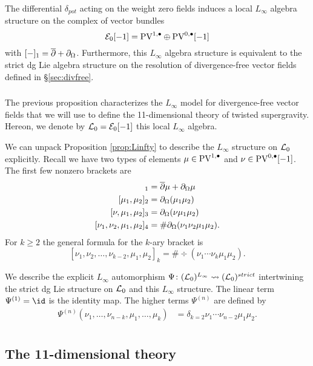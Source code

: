 \documentclass[11pt]{amsart}
\begin{document}
\begin{prop}
\label{prop:Linfty}
The differential $\delta_{pot}$ acting on the weight zero fields induces a local $L_\infty$ algebra structure on the complex of vector bundles 
\[
\mathcal E_0 [-1] = {\rm PV}^{1,\bullet} \oplus {\rm PV}^{0,\bullet}[-1]
\]
with $[-]_1 = \overline{\partial} + \partial_{\Omega}$. 
Furthermore, this $L_\infty$ algebra structure is equivalent to the strict dg Lie algebra structure on the resolution of divergence-free vector fields defined in \S \ref{sec:divfree}. 
\end{prop}

\subsubsection{}
\label{sec:Linfty}

The previous proposition characterizes the $L_\infty$ model for divergence-free vector fields that we will use to define the 11-dimensional theory of twisted supergravity. 
Hereon, we denote by $\mathcal L_0 = \mathcal E_0[-1]$ this local $L_\infty$ algebra. 

We can unpack Proposition \ref{prop:Linfty} to describe the $L_\infty$ structure on $\mathcal L_0$ explicitly. 
Recall we have two types of elements $\mu \in {\rm PV}^{1,\bullet}$ and $\nu \in {\rm PV}^{0,\bullet}[-1]$. 
The first few nonzero brackets are
\begin{align*}
[\mu]_1 & = \dbar \mu + \div \mu \\
[\mu_1,\mu_2]_2 & = \div (\mu_1 \mu_2) \\
[\nu, \mu_1,\mu_2]_3 & = \div(\nu \mu_1 \mu_2) \\
[\nu_1,\nu_2, \mu_1,\mu_2]_4 & = \# \div(\nu_1 \nu_2 \mu_1 \mu_2).
\end{align*}
For $k \geq 2$ the general formula for the $k$-ary bracket is 
\[
[\nu_1,\nu_2, \ldots, \nu_{k-2}, \mu_1,\mu_2]_{k} = \# \div(\nu_1 \cdots \nu_k \mu_1 \mu_2) .
\]

We describe the explicit $L_\infty$ automorphism $\Psi \colon (\mathcal L_0)^{L_\infty} \rightsquigarrow (\mathcal L_0)^{strict}$ intertwining the strict dg Lie structure on $\mathcal L_0$ and this $L_\infty$ structure.
The linear term $\Psi^{(1)} = \id$ is the identity map. 
The higher terms $\Psi^{(n)}$ are defined by 
\begin{align*}
\Psi^{(n)} (\nu_1,\ldots, \nu_{n-k},\mu_1,\ldots, \mu_k) & = \delta_{k=2} \nu_1 \cdots \nu_{n-2} \mu_1 \mu_2 . \\
\end{align*}

\subsection{The 11-dimensional theory}
\end{document}
